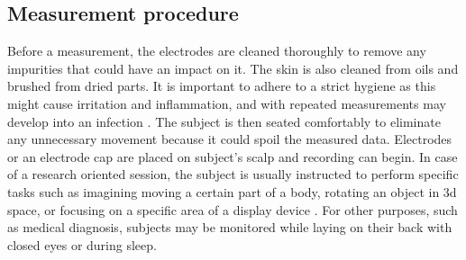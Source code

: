 \subsection{Measurement procedure}
Before a measurement, the electrodes are cleaned thoroughly to remove any
impurities that could have an impact on it. The skin is also cleaned from oils
and brushed from dried parts. It is important to adhere to a strict hygiene as
this might cause irritation and inflammation, and with repeated measurements may
develop into an infection \cite{eegFund}. The subject is then seated comfortably
to eliminate any unnecessary movement because it could spoil the measured data.
Electrodes or an electrode cap are placed on subject's scalp and recording can begin.
In case of a research oriented session, the subject is usually instructed to
perform specific tasks such as imagining moving a certain part of a body, rotating
an object in \gls{3d} space, or focusing on a specific area of a display device \cite{bcComm}. For other
purposes, such as medical diagnosis, subjects may be monitored while laying on
their back with closed eyes or during sleep.

